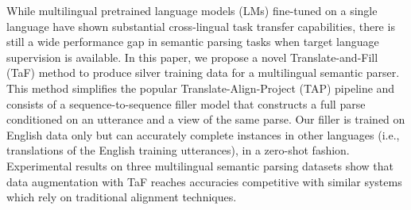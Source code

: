While multilingual pretrained language models (LMs) fine-tuned on a single language have shown substantial cross-lingual task transfer capabilities, there is still a wide performance gap in semantic parsing tasks when target language supervision is available. In this paper, we propose a novel Translate-and-Fill (TaF) method to produce silver training data for a multilingual semantic parser. This method simplifies the popular Translate-Align-Project (TAP) pipeline and consists of a sequence-to-sequence filler model that constructs a full parse conditioned on an utterance and a view of the same parse. Our filler is trained on English data only but can accurately complete instances in other languages (i.e., translations of the English training utterances), in a zero-shot fashion. Experimental results on three multilingual semantic parsing datasets show that data augmentation with TaF reaches accuracies competitive with similar systems which rely on traditional alignment techniques.
